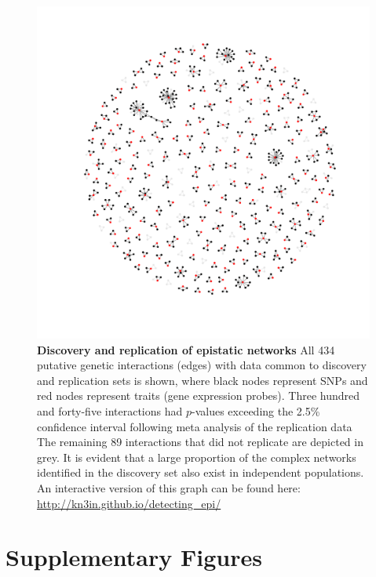 \documentclass{article}
\begin{document}
\begin{figure}[H]
	\centering
	\includegraphics[width=5in]{pale_gray_graph_of_interactions_2_lists_GrayEdges}
	\caption{\textbf{Discovery and replication of epistatic networks} All 434 putative genetic interactions (edges) with data common to discovery and replication sets is shown, where black nodes represent SNPs and red nodes represent traits (gene expression probes). Three hundred and forty-five interactions had $p$-values exceeding the 2.5\% confidence interval following meta analysis of the replication data The remaining 89 interactions that did not replicate are depicted in grey. It is evident that a large proportion of the complex networks identified in the discovery set also exist in independent populations. An interactive version of this graph can be found here: \url{http://kn3in.github.io/detecting_epi/}}
	\label{fig:fireworks}
\end{figure}

\clearpage


\clearpage


\section*{Supplementary Figures}
\setcounter{figure}{0}
\makeatletter 
\renewcommand{\thefigure}{S\@arabic\c@figure} 
\makeatletter 
\end{document}
